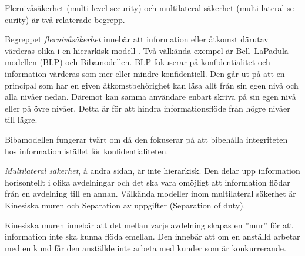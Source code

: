 \documentclass[a4paper,addpoints]{miunexam}
\begin{document}
\begin{questions}
  \question\label{q:multilevel}
  Flernivåsäkerhet (\foreignlanguage{english}{multi-level security}) och 
  multilateral säkerhet (\foreignlanguage{english}{multi-lateral security}) är 
  två relaterade begrepp.


  \begin{solution}
    Begreppet \emph{flernivåsäkerhet} innebär att information eller åtkomst 
    därutav värderas olika i en hierarkisk modell \cite[kap.\ 
    8]{Anderson2008sea}.
    Två välkända exempel är Bell--LaPadula-modellen (BLP) och Bibamodellen.
    BLP fokuserar på konfidentialitet och information värderas som mer eller 
    mindre konfidentiell.
    Den går ut på att en principal som har en given åtkomstbehörighet kan läsa 
    allt från sin egen nivå och alla nivåer nedan.
    Däremot kan samma användare enbart skriva på sin egen nivå eller på övre 
    nivåer.
    Detta är för att hindra informationsflöde från högre nivåer till lägre.

    Bibamodellen fungerar tvärt om då den fokuserar på att bibehålla 
    integriteten hos information istället för konfidentialiteten.

    \emph{Multilateral säkerhet}, å andra sidan, är inte hierarkisk.
    Den delar upp information horisontellt i olika avdelningar och det ska vara 
    omöjligt att information flödar från en avdelning till en annan.
    Välkända modeller inom multilateral säkerhet är Kinesiska muren och 
    Separation av uppgifter (\foreignlanguage{english}{Separation of duty}).

    Kinesiska muren innebär att det mellan varje avdelning skapas en ''mur'' 
    för att information inte ska kunna flöda emellan.
    Den innebär att om en anställd arbetar med en kund får den anställde inte 
    arbeta med kunder som är konkurrerande.


\end{solution}
\end{questions}
\end{document}
